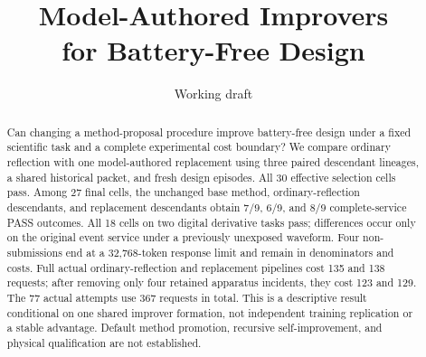 \documentclass[10pt]{article}
\title{Model-Authored Improvers\\for Battery-Free Design}
\author{Working draft}
\date{}
\begin{document}
\maketitle
\begin{abstract}
Can changing a method-proposal procedure improve battery-free design under a
fixed scientific task and a complete experimental cost boundary? We compare
ordinary reflection with one model-authored replacement using three paired
descendant lineages, a shared historical packet, and fresh design episodes.
All 30 effective selection cells pass. Among 27 final cells, the unchanged
base method, ordinary-reflection descendants, and replacement descendants
obtain 7/9, 6/9, and 8/9 complete-service PASS outcomes. All 18 cells on two
digital derivative tasks pass; differences occur only on the original event
service under a previously unexposed waveform. Four non-submissions end at a
32,768-token response limit and remain in denominators and costs. Full actual
ordinary-reflection and replacement pipelines cost 135 and 138 requests;
after removing only four retained apparatus incidents, they cost 123 and 129.
The 77 actual attempts use 367 requests in total. This is a descriptive result
conditional on one shared improver formation, not independent training
replication or a stable advantage. Default method promotion, recursive
self-improvement, and physical qualification are not established.
\end{abstract}

\end{document}
